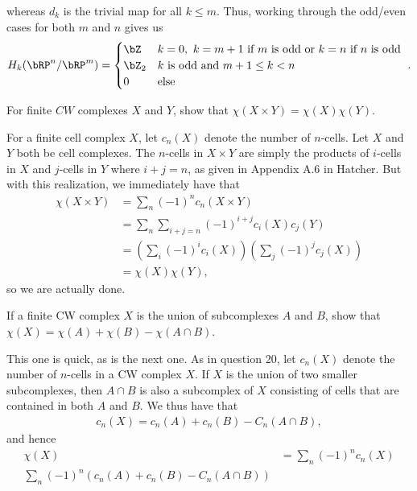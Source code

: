 \begin{homework}[e]
\begin{prf}
    whereas $d_k$ is the trivial map for all $k \leq m$. Thus, working through the odd/even cases for both $m$ and $n$ gives us
    \begin{align*}
      H_k(\bRP^n/\bRP^m) =
      \begin{cases}
        \bZ & k = 0, ~k = m + 1 \text{ if $m$ is odd or} ~ k = n \text{ if $n$ is odd } \\
        \bZ_2 & k \text{ is odd and } m + 1 \leq k < n \\
        0 & \text{else}
      \end{cases}.
    \end{align*}
  \end{prf}
   For finite $CW$ complexes $X$ and $Y$, show that $\chi(X\times Y) = \chi(X)\chi(Y)$.
  \begin{prf}
    For a finite cell complex $X$, let $c_n(X)$ denote the number of $n$-cells. Let $X$ and $Y$ both be cell complexes. The $n$-cells in $X\times Y$ are simply the products of $i$-cells in $X$ and $j$-cells in $Y$ where $i + j = n$, as given in Appendix A.6 in Hatcher. But with this realization, we immediately have that
    \begin{align*}
      \chi(X\times Y) 
      &= \sum_{n} (-1)^{n} c_n(X\times Y) \\
      &= \sum_n \sum_{i+j = n}(-1)^{i+j}c_i(X)c_j(Y) \\
      &= \left(\sum_i (-1)^ic_i(X)\right) \left(\sum_{j}(-1)^j c_j(X)\right) \\
      &= \chi(X)\chi(Y),
    \end{align*}
    so we are actually done.
  \end{prf}
   If a finite CW complex $X$ is the union of subcomplexes $A$ and $B$, show that $\chi(X) = \chi(A) + \chi(B) - \chi(A\cap B)$.
  \begin{prf}
    This one is quick, as is the next one. As in question 20, let $c_n(X)$ denote the number of $n$-cells in a CW complex $X$. If $X$ is the union of two smaller subcomplexes, then $A\cap B$ is also a subcomplex of $X$ consisting of cells that are contained in both $A$ and $B$. We thus have that
    \begin{align*}
      c_n(X) = c_n(A) + c_n(B) - C_n(A\cap B),
    \end{align*}
    and hence
    \begin{align*}
      \chi(X) 
      &= \sum_n (-1)^{n} c_n(X) \\
      \sum_n(-1)^n(c_n(A) + c_n(B) - C_n(A\cap B)) \\

\end{align*}
\end{prf}
\end{homework}
